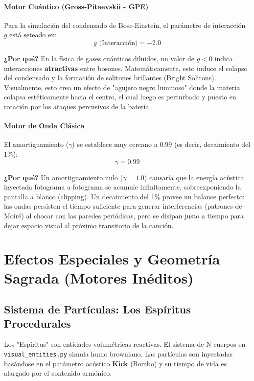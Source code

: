 \documentclass[12pt, openany]{book}
\begin{document}
\subsection{Motor Cuántico (Gross-Pitaevskii - GPE)}
Para la simulación del condensado de Bose-Einstein, el parámetro de interacción $g$ está seteado en:
\begin{equation}
g \text{ (Interacción)} = -2.0
\end{equation}

\textbf{¿Por qué?} En la física de gases cuánticos diluidos, un valor de $g < 0$ indica interacciones \textbf{atractivas} entre bosones. Matemáticamente, esto induce el colapso del condensado y la formación de solitones brillantes (Bright Solitons). Visualmente, esto crea un efecto de "agujero negro luminoso" donde la materia colapsa estéticamente hacia el centro, el cual luego es perturbado y puesto en rotación por los ataques percusivos de la batería.

\subsection{Motor de Onda Clásica}
El amortiguamiento ($\gamma$) se establece muy cercano a $0.99$ (es decir, decaimiento del 1\%):
\begin{equation}
\gamma = 0.99
\end{equation}

\textbf{¿Por qué?} Un amortiguamiento nulo ($\gamma = 1.0$) causaría que la energía acústica inyectada fotograma a fotograma se acumule infinitamente, sobreexponiendo la pantalla a blanco (clipping). Un decaimiento del 1\% provee un balance perfecto: las ondas persisten el tiempo suficiente para generar interferencias (patrones de Moiré) al chocar con las paredes periódicas, pero se disipan justo a tiempo para dejar espacio visual al próximo transitorio de la canción.

\part{Efectos Especiales y Geometría Sagrada (Motores Inéditos)}


\chapter{Sistema de Partículas: Los Espíritus Procedurales}
Los "Espíritus" son entidades volumétricas reactivas. El sistema de N-cuerpos en \texttt{visual\_entities.py} simula humo browniano.
Las partículas son inyectadas basándose en el parámetro acústico \textbf{Kick} (Bombo) y su tiempo de vida es alargado por el contenido armónico.
\end{document}
